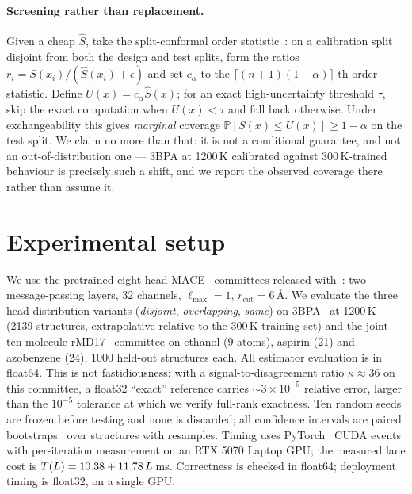 \documentclass{article}
\begin{document}
\paragraph{Screening rather than replacement.}
Given a cheap $\widehat S$, take the split-conformal order statistic~\citep{vovk2005,crc}: on a
calibration split disjoint from both the design and test splits, form the ratios
$r_i=S(x_i)/(\widehat S(x_i)+\epsilon)$ and set $c_\alpha$ to the
$\lceil (n+1)(1-\alpha)\rceil$-th order statistic. Define $U(x)=c_\alpha\widehat S(x)$; for an exact
high-uncertainty threshold $\tau$, skip the exact computation when $U(x)<\tau$ and fall back
otherwise. Under exchangeability this gives \emph{marginal} coverage
$\mathbb P\!\left[S(x)\le U(x)\right]\ge 1-\alpha$ on the test split. We claim no more than that: it
is not a conditional guarantee, and not an out-of-distribution one --- 3BPA at 1200\,K calibrated
against 300\,K-trained behaviour is precisely such a shift, and we report the observed coverage
there rather than assume it.

\section{Experimental setup}
\label{sec:setup}
We use the pretrained eight-head MACE~\citep{mace} committees released with~\citet{beck2025mhc}: two message-passing
layers, 32 channels, $\ell_{\max}=1$, $r_{\mathrm{cut}}=6$\,\AA. We evaluate the three
head-distribution variants (\emph{disjoint}, \emph{overlapping}, \emph{same}) on 3BPA~\citep{botnet3bpa} at 1200\,K
(2139 structures, extrapolative relative to the 300\,K training set) and the joint ten-molecule
rMD17~\citep{rmd17} committee on ethanol (9 atoms), aspirin (21) and azobenzene (24), 1000 held-out structures each.
All estimator evaluation is in float64. This is not fastidiousness: with a signal-to-disagreement ratio
$\kappa\approx36$ on this committee, a float32 ``exact'' reference carries $\sim\!3\times10^{-5}$
relative error, larger than the $10^{-5}$ tolerance at which we verify full-rank exactness.
Ten random seeds are frozen before testing and none is discarded; all confidence
intervals are paired bootstraps~\citep{efron} over structures with \fsNBoot{} resamples. Timing uses PyTorch~\citep{pytorch} CUDA events with
per-iteration measurement on an RTX 5070 Laptop GPU; the measured lane cost is
$T(L)=10.38 + 11.78\,L$\,ms. Correctness is checked in float64; deployment timing
is float32, on a single GPU.
\end{document}
